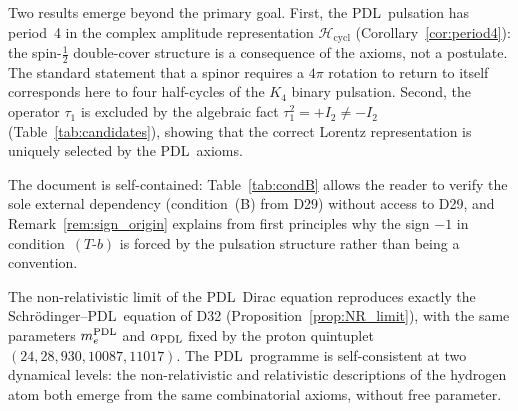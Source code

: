 \documentclass[11pt,a4paper]{article}
\theoremstyle{definition}
\newcommand{\PDL}{\textnormal{PDL}}
\newcommand{\aPDL}{\alpha_{\PDL}}
\newcommand{\mePDL}{m_e^{\PDL}}
\newcommand{\Hcycl}{\mathcal{H}_{\mathrm{cycl}}}
\newcommand{\Kfour}{K_4}
\begin{document}
Two results emerge beyond the primary goal. First, the \PDL\ pulsation has period~4 in the complex amplitude representation $\Hcycl$ (Corollary~\ref{cor:period4}): the spin-$\tfrac{1}{2}$ double-cover structure is a consequence of the axioms, not a postulate. The standard statement that a spinor requires a $4\pi$ rotation to return to itself corresponds here to four half-cycles of the $\Kfour$ binary pulsation. Second, the operator $\tau_1$ is excluded by the algebraic fact $\tau_1^2 = +I_2 \neq -I_2$ (Table~\ref{tab:candidates}), showing that the correct Lorentz representation is uniquely selected by the \PDL\ axioms.

The document is self-contained: Table~\ref{tab:condB} allows the reader to verify the sole external dependency (condition~(B) from D29) without access to D29, and Remark~\ref{rem:sign_origin} explains from first principles why the sign $-1$ in condition~$(T\textrm{-}b)$ is forced by the pulsation structure rather than being a convention.

The non-relativistic limit of the \PDL\ Dirac equation reproduces exactly the Schr\"odinger--\PDL\ equation of D32 (Proposition~\ref{prop:NR_limit}), with the same parameters $\mePDL$ and $\aPDL$ fixed by the proton quintuplet $(24, 28, 930, 10087, 11017)$. The \PDL\ programme is self-consistent at two dynamical levels: the non-relativistic and relativistic descriptions of the hydrogen atom both emerge from the same combinatorial axioms, without free parameter.


\nocite{*}

\end{document}
